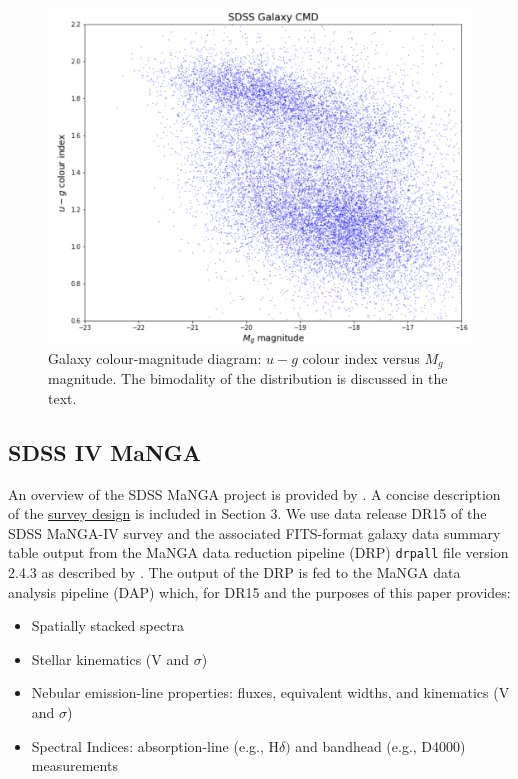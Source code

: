 \begin{figure}
	\includegraphics[width=\columnwidth]{images/CMDs/galaxyCMD.PNG}
    \caption{Galaxy colour-magnitude diagram: $u-g$ colour index versus $M_g$ magnitude. The bimodality of the distribution is discussed in the text.}
    \label{fig:CMD1}
\end{figure}

\subsection{SDSS IV MaNGA}
An overview of the SDSS MaNGA project is provided by \citet{2015ApJ...798....7B}. A concise description of the \href{https://iopscience.iop.org/article/10.1088/0004-637X/798/1/7/meta#apj504473s3}{survey design} is included in Section 3. We use data release DR15 of the SDSS MaNGA-IV survey \citep{2019ApJS..240...23A} and the associated FITS-format galaxy data summary table output from the MaNGA data reduction pipeline (DRP) \texttt{drpall} file version 2.4.3 as described by \citet{2016AJ....152...83L}. The output of the DRP is fed to the MaNGA data analysis pipeline (DAP) which, for DR15 and the purposes of this paper provides:
\begin{itemize}
    \item Spatially stacked spectra
    \item Stellar kinematics (V and $\sigma$)
    \item Nebular emission-line properties: fluxes, equivalent widths, and kinematics (V and $\sigma$)
    \item Spectral Indices: absorption-line (e.g., H$\delta)$ and bandhead (e.g., D4000) measurements
\end{itemize}

